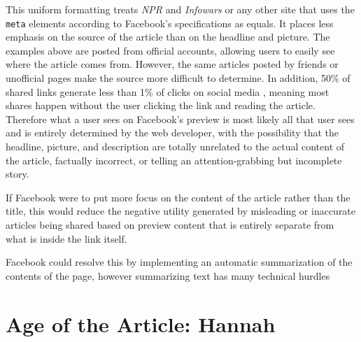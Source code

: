 \documentclass[12pt]{article}
\begin{document}
This uniform formatting treats {\it NPR} and {\it Infowars} or any other site that uses the \texttt{meta} elements according to Facebook's specifications as equals. It places less emphasis on the source of the article than on the headline and picture. The examples above are posted from official accounts, allowing users to easily see where the article comes from. However, the same articles posted by friends or unofficial pages make the source more difficult to determine. In addition, 50\% of shared links generate less than 1\% of clicks on social media \citep{clicks_vs_shares}, meaning most shares happen without the user clicking the link and reading the article. Therefore what a user sees on Facebook's preview is most likely all that user sees and is entirely determined by the web developer, with the possibility that the headline, picture, and description are totally unrelated to the actual content of the article, factually incorrect, or telling an attention-grabbing but incomplete story.

If Facebook were to put more focus on the content of the article rather than the title, this would reduce the negative utility generated by misleading or inaccurate articles being shared based on preview content that is entirely separate from what is inside the link itself.

Facebook could resolve this by implementing an automatic summarization of the contents of the page, however summarizing text has many technical hurdles

\section{Age of the Article: Hannah}
\end{document}
